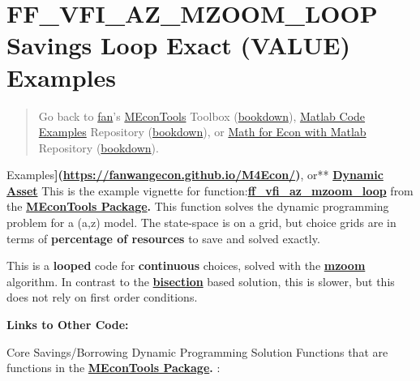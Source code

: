 \documentclass[
]{book}
\begin{document}
\hypertarget{ff_vfi_az_mzoom_loop-savings-loop-exact-value-examples}{%
\section{FF\_VFI\_AZ\_MZOOM\_LOOP Savings Loop Exact (VALUE) Examples}\label{ff_vfi_az_mzoom_loop-savings-loop-exact-value-examples}}

\begin{quote}
Go back to \href{http://fanwangecon.github.io/}{fan}'s \href{https://fanwangecon.github.io/MEconTools/}{MEconTools} Toolbox (\href{https://fanwangecon.github.io/MEconTools/bookdown}{bookdown}), \href{https://fanwangecon.github.io/M4Econ/}{Matlab Code Examples} Repository (\href{https://fanwangecon.github.io/M4Econ/bookdown}{bookdown}), or \href{https://fanwangecon.github.io/Math4Econ/}{Math for Econ with Matlab} Repository (\href{https://fanwangecon.github.io/Math4Econ/bookdown}{bookdown}).
\end{quote}

Examples\textbf{{]}(\url{https://fanwangecon.github.io/M4Econ/})}, or** \href{https://fanwangecon.github.io/CodeDynaAsset/}{\textbf{Dynamic
Asset}}
This is the example vignette for function:\href{https://github.com/FanWangEcon/MEconTools/blob/master/MEconTools/vfi/ff_vfi_az_mzoom_loop.m}{\textbf{ff\_vfi\_az\_mzoom\_loop}}
from the \href{https://fanwangecon.github.io/MEconTools/}{\textbf{MEconTools
Package}}\textbf{.} This function
solves the dynamic programming problem for a (a,z) model. The
state-space is on a grid, but choice grids are in terms of \textbf{percentage
of resources} to save and solved exactly.

This is a \textbf{looped} code for \textbf{continuous} choices, solved with the
\href{https://fanwangecon.github.io/MEconTools/MEconTools/doc/optim/htmlpdfm/fx_optim_mzoom_savezrone.html}{\textbf{mzoom}}
algorithm. In contrast to the
\href{https://fanwangecon.github.io/MEconTools/MEconTools/doc/optim/htmlpdfm/fx_optim_bisec_savezrone.html}{\textbf{bisection}}
based solution, this is slower, but this does not rely on first order
conditions.

\textbf{Links to Other Code:}

Core Savings/Borrowing Dynamic Programming Solution Functions that are
functions in the \href{https://fanwangecon.github.io/MEconTools/}{\textbf{MEconTools
Package}}\textbf{.} :
\end{document}
